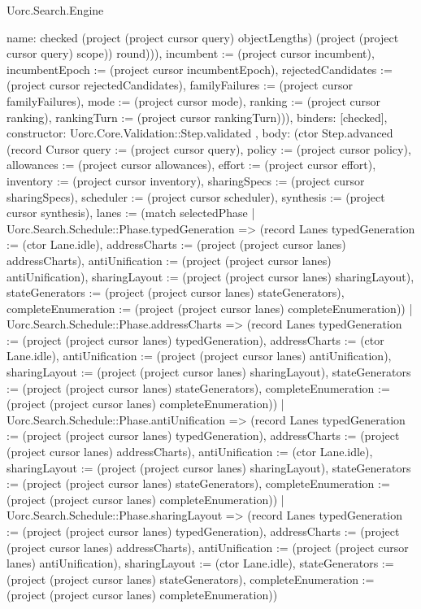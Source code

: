 \begin{lexlean}{Uorc.Search.Engine}
\begin{semanticmodule}
{{{{{{              name: checked
            } (project (project cursor query) objectLengths) (project (project cursor query) scope)) round)})), incumbent := (project cursor incumbent), incumbentEpoch := (project cursor incumbentEpoch), rejectedCandidates := (project cursor rejectedCandidates), familyFailures := (project cursor familyFailures), mode := (project cursor mode), ranking := (project cursor ranking), rankingTurn := (project cursor rankingTurn)})),
          binders: [checked],
          constructor: Uorc.Core.Validation::Step.validated
        },
        {
          body: (ctor Step.advanced (record Cursor {query := (project cursor query), policy := (project cursor policy), allowances := (project cursor allowances), effort := (project cursor effort), inventory := (project cursor inventory), sharingSpecs := (project cursor sharingSpecs), scheduler := (project cursor scheduler), synthesis := (project cursor synthesis), lanes := (match selectedPhase
            | Uorc.Search.Schedule::Phase.typedGeneration => (record Lanes {typedGeneration := (ctor Lane.idle), addressCharts := (project (project cursor lanes) addressCharts), antiUnification := (project (project cursor lanes) antiUnification), sharingLayout := (project (project cursor lanes) sharingLayout), stateGenerators := (project (project cursor lanes) stateGenerators), completeEnumeration := (project (project cursor lanes) completeEnumeration)})
            | Uorc.Search.Schedule::Phase.addressCharts => (record Lanes {typedGeneration := (project (project cursor lanes) typedGeneration), addressCharts := (ctor Lane.idle), antiUnification := (project (project cursor lanes) antiUnification), sharingLayout := (project (project cursor lanes) sharingLayout), stateGenerators := (project (project cursor lanes) stateGenerators), completeEnumeration := (project (project cursor lanes) completeEnumeration)})
            | Uorc.Search.Schedule::Phase.antiUnification => (record Lanes {typedGeneration := (project (project cursor lanes) typedGeneration), addressCharts := (project (project cursor lanes) addressCharts), antiUnification := (ctor Lane.idle), sharingLayout := (project (project cursor lanes) sharingLayout), stateGenerators := (project (project cursor lanes) stateGenerators), completeEnumeration := (project (project cursor lanes) completeEnumeration)})
            | Uorc.Search.Schedule::Phase.sharingLayout => (record Lanes {typedGeneration := (project (project cursor lanes) typedGeneration), addressCharts := (project (project cursor lanes) addressCharts), antiUnification := (project (project cursor lanes) antiUnification), sharingLayout := (ctor Lane.idle), stateGenerators := (project (project cursor lanes) stateGenerators), completeEnumeration := (project (project cursor lanes) completeEnumeration)})
}}}}
\end{semanticmodule}
\end{lexlean}
